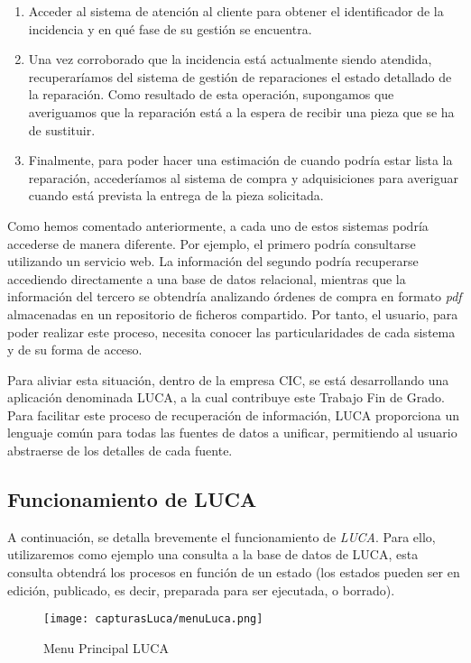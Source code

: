 \begin{enumerate}
	\item Acceder al sistema de atención al cliente para obtener el identificador de la incidencia y en qué fase de su gestión se encuentra.
	\item Una vez corroborado que la incidencia está actualmente siendo atendida, recuperaríamos del sistema de gestión de reparaciones el estado detallado de la reparación. Como resultado de esta operación, supongamos que averiguamos que la reparación está a la espera de recibir una pieza que se ha de sustituir.
	\item Finalmente, para poder hacer una estimación de cuando podría estar lista la reparación, accederíamos al sistema de compra y adquisiciones para averiguar cuando está prevista la entrega de la pieza solicitada.
\end{enumerate}

Como hemos comentado anteriormente, a cada uno de estos sistemas podría accederse de manera diferente. Por ejemplo, el primero podría consultarse utilizando un servicio web. La información del segundo podría recuperarse accediendo directamente a una base de datos relacional, mientras que la información del tercero se obtendría analizando órdenes de compra en formato \emph{pdf} almacenadas en un repositorio de ficheros compartido. Por tanto, el usuario, para poder realizar este proceso, necesita conocer las particularidades de cada sistema y de su forma de acceso.

Para aliviar esta situación, dentro de la empresa CIC, se está desarrollando una aplicación denominada LUCA, a la cual contribuye este Trabajo Fin de Grado. Para facilitar este proceso de recuperación de información, LUCA proporciona un lenguaje común para todas las fuentes de datos a unificar, permitiendo al usuario abstraerse de los detalles de cada fuente.

\subsection{Funcionamiento de LUCA}

A continuación, se detalla brevemente el funcionamiento de \emph{LUCA}. Para ello, utilizaremos como ejemplo una consulta a la base de datos de LUCA, esta consulta obtendrá los procesos en función de un estado (los estados pueden ser en edición, publicado, es decir, preparada para ser ejecutada, o borrado).

\begin{figure}[!tb]
    \centering
 	\texttt{[image: capturasLuca/menuLuca.png]}
	\caption{Menu Principal LUCA}
    \label{fig:menuLuca}
\end{figure}

